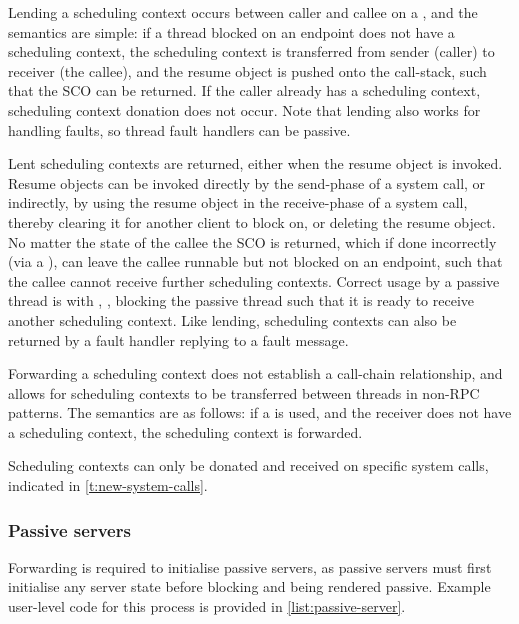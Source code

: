 Lending a scheduling context occurs between caller and callee on a \call, and
the semantics are simple: if a thread 
blocked on an endpoint does not have a scheduling context, the scheduling context is transferred
from sender (caller) to receiver (the callee), and the resume object is pushed
onto the call-stack, such that the \gls{SCO} can be returned. If the caller already has a scheduling
context, scheduling context donation does not occur. Note that lending also works for
handling faults, so thread fault handlers can be passive.

Lent scheduling contexts are returned, either when the resume object is invoked. Resume objects 
can be invoked directly by the send-phase of a system call, or indirectly, by using the
resume object in the receive-phase of a system call, thereby clearing it for another client to block
on, or deleting the resume object.
No matter the state of the callee the \gls{SCO} is returned, which if done
incorrectly (via a \send), can leave the callee runnable but not blocked on an endpoint, such that 
the callee cannot receive further scheduling contexts. Correct usage by a passive thread is with \replyrecv,
\nbsendrecv, blocking the passive thread such that it is ready to receive another scheduling
context. Like lending, scheduling contexts can also be returned by a fault handler replying to a fault message.

Forwarding a scheduling context does not establish a call-chain relationship, and allows
for scheduling contexts to be transferred between threads in non-RPC patterns. The semantics are
as follows: if a \nbsendrecv is used, and the receiver does not have a scheduling context,
the scheduling context is forwarded. 

Scheduling contexts can only be donated and received on specific system calls, indicated in
\cref{t:new-system-calls}. 

\subsubsection{Passive servers}
\label{sec:impl-passive-servers}

Forwarding is required to initialise passive servers, as passive servers must first initialise any 
server state before blocking and being rendered passive. Example user-level code for this process is 
provided in \cref{list:passive-server}. 

